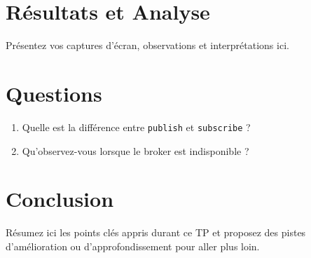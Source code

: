\documentclass[12pt,a4paper]{report}
\begin{document}
\section{Résultats et Analyse}

Présentez vos captures d'écran, observations et interprétations ici.

\section{Questions}

\begin{questionbox}
    \begin{enumerate}
        \item Quelle est la différence entre \texttt{publish} et \texttt{subscribe} ?
        \item Qu'observez-vous lorsque le broker est indisponible ?
    \end{enumerate}
\end{questionbox}

\section{Conclusion}

\begin{cardtip}
    Résumez ici les points clés appris durant ce TP et proposez des pistes d'amélioration
    ou d'approfondissement pour aller plus loin.
\end{cardtip}
\end{document}
